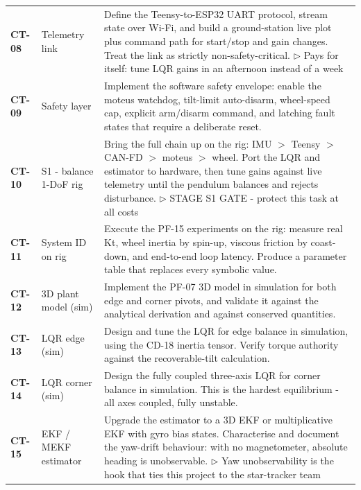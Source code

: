 {\begin{longtable}{@{}L{1.1cm} L{3.0cm} L{11.0cm}@{}}
\textbf{CT-08} & Telemetry link & Define the Teensy-to-ESP32 UART protocol, stream state over Wi-Fi, and build a ground-station live plot plus command path for start/stop and gain changes. Treat the link as strictly non-safety-critical. \newline\textcolor{p0col}{\footnotesize$\triangleright$ Pays for itself: tune LQR gains in an afternoon instead of a week} \\[2pt]
\textbf{CT-09} & Safety layer & Implement the software safety envelope: enable the moteus watchdog, tilt-limit auto-disarm, wheel-speed cap, explicit arm/disarm command, and latching fault states that require a deliberate reset. \\[2pt]
\textbf{CT-10} & S1 - balance 1-DoF rig & Bring the full chain up on the rig: IMU $>$ Teensy $>$ CAN-FD $>$ moteus $>$ wheel. Port the LQR and estimator to hardware, then tune gains against live telemetry until the pendulum balances and rejects disturbance. \newline\textcolor{p0col}{\footnotesize$\triangleright$ STAGE S1 GATE - protect this task at all costs} \\[2pt]
\textbf{CT-11} & System ID on rig & Execute the PF-15 experiments on the rig: measure real Kt, wheel inertia by spin-up, viscous friction by coast-down, and end-to-end loop latency. Produce a parameter table that replaces every symbolic value. \\[2pt]
\textbf{CT-12} & 3D plant model (sim) & Implement the PF-07 3D model in simulation for both edge and corner pivots, and validate it against the analytical derivation and against conserved quantities. \\[2pt]
\textbf{CT-13} & LQR edge (sim) & Design and tune the LQR for edge balance in simulation, using the CD-18 inertia tensor. Verify torque authority against the recoverable-tilt calculation. \\[2pt]
\textbf{CT-14} & LQR corner (sim) & Design the fully coupled three-axis LQR for corner balance in simulation. This is the hardest equilibrium - all axes coupled, fully unstable. \\[2pt]
\textbf{CT-15} & EKF / MEKF estimator & Upgrade the estimator to a 3D EKF or multiplicative EKF with gyro bias states. Characterise and document the yaw-drift behaviour: with no magnetometer, absolute heading is unobservable. \newline\textcolor{p0col}{\footnotesize$\triangleright$ Yaw unobservability is the hook that ties this project to the star-tracker team} \\[2pt]

\end{longtable}}
